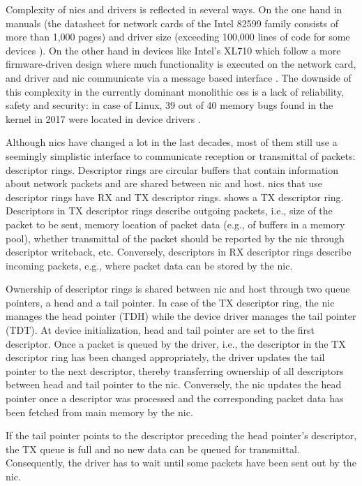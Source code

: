 Complexity of \acp{nic} and drivers is reflected in several ways. On the one
hand in manuals (the datasheet for network cards of the Intel 82599 family
\cite{intel2019datasheet} consists of more than 1,000 pages) and driver size
(exceeding 100,000 lines of code for some devices \cite{emmerich2019case}). On
the other hand in devices like Intel's XL710 which follow a more firmware-driven
design where much functionality is executed on the network card, and driver and
\ac{nic} communicate via a message based interface \cite{emmerich2019user}. The
downside of this complexity in the currently dominant monolithic \aclp{os} is a
lack of reliability, safety and security: in case of Linux, 39 out of 40 memory
bugs found in the kernel in 2017 were located in device drivers
\cite{emmerich2019case}.

Although \acp{nic} have changed a lot in the last decades, most of them still
use a seemingly simplistic interface to communicate reception or transmittal of
packets: descriptor rings. Descriptor rings are circular buffers that contain
information about network packets and are shared between \ac{nic} and host.
\acp{nic} that use descriptor rings have RX and TX descriptor rings.
 shows a TX descriptor ring. Descriptors in TX descriptor
rings describe outgoing packets, i.e., size of the packet to be sent, memory
location of packet data (e.g., of buffers in a memory pool), whether transmittal
of the packet should be reported by the \ac{nic} through descriptor writeback,
etc. Conversely, descriptors in RX descriptor rings describe incoming packets,
e.g., where packet data can be stored by the \ac{nic}.

Ownership of descriptor rings is shared between \ac{nic} and host through two
queue pointers, a head and a tail pointer. In case of the TX descriptor ring,
the \ac{nic} manages the head pointer (TDH) while the device driver manages the
tail pointer (TDT). At device initialization, head and tail pointer are set to
the first descriptor. Once a packet is queued by the driver, i.e., the
descriptor in the TX descriptor ring has been changed appropriately, the driver
updates the tail pointer to the next descriptor, thereby transferring ownership
of all descriptors between head and tail pointer to the \ac{nic}. Conversely,
the \ac{nic} updates the head pointer once a descriptor was processed and the
corresponding packet data has been fetched from main memory by the \ac{nic}.

If the tail pointer points to the descriptor preceding the head pointer's
descriptor, the TX queue is full and no new data can be queued for transmittal.
Consequently, the driver has to wait until some packets have been sent out by
the \ac{nic}.


